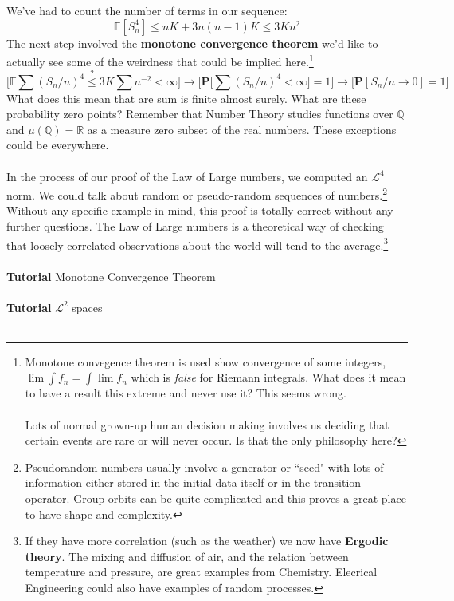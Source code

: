 \documentclass[12pt]{article}
\begin{document}
We've had to count the number of terms in our sequence:
$$  \mathbb{E}[S_n^4] \leq n K + 3n(n-1)K \leq 3Kn^2 $$
The next step involved the {\textbf{monotone convergence theorem}} we'd like to actually see some of the weirdness that could be implied here.\footnote{Monotone convegence theorem is used show convergence of some integers, $\lim \int f_n = \int \lim f_n $ which is \textit{false} for Riemann integrals.  What does it mean to have a result this extreme and never use it?  This seems wrong.  \\ \\
Lots of normal grown-up human decision making involves us deciding that certain events are rare or will never occur.  Is that the only philosophy here?}
$$ \bigg[ \mathbb{E} \sum (S_n/n)^4 \stackrel{?}{\leq} 3K \sum n^{-2}  < \infty \bigg] \to \bigg[ \textbf{P}\big[ \sum (S_n/n)^4 < \infty \big]=1 \bigg] \to \bigg[ \textbf{P}[S_n/n \to 0] = 1 \bigg] $$
What does this mean that are sum is finite almost surely.  What are these probability zero points?  Remember that Number Theory studies functions over $\mathbb{Q}$ and $\mu(\mathbb{Q}) = \mathbb{R}$ as a measure zero subset of the real numbers.  These exceptions could be everywhere. \\ \\
In the process of our proof of the Law of Large numbers, we computed an $\mathcal{L}^4$ norm.  We could talk about random or pseudo-random sequences of numbers.\footnote{Pseudorandom numbers usually involve a generator or ``seed" with lots of information either stored in the initial data itself or in the transition operator.  Group orbits can be quite complicated and this proves a great place to have shape and complexity.}  Without any specific example in mind, this proof is totally correct without any further questions.  The Law of Large numbers is a theoretical way of checking that loosely correlated observations about the world will tend to the average.\footnote{If they have more correlation (such as the weather) we now have \textbf{Ergodic theory}.  The mixing and diffusion of air, and the relation between temperature and pressure, are great examples from Chemistry. Elecrical Engineering could also have examples of random processes. } \\ \\
\textbf{Tutorial} Monotone Convergence Theorem \\ \\
\textbf{Tutorial} $\mathcal{L}^2$ spaces \\ \\
\end{document}
